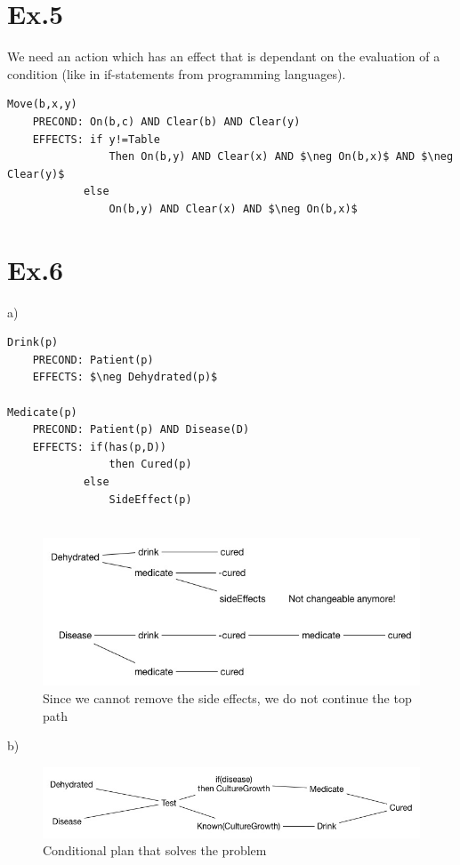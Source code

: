 \documentclass[11pt]{article}
\begin{document}
\section*{Ex.5}

We need an action which has an effect that is dependant on the evaluation of a condition (like in if-statements from programming languages).

\begin{lstlisting}[mathescape=true]
Move(b,x,y)
    PRECOND: On(b,c) AND Clear(b) AND Clear(y)
    EFFECTS: if y!=Table 
                Then On(b,y) AND Clear(x) AND $\neg On(b,x)$ AND $\neg Clear(y)$
            else
                On(b,y) AND Clear(x) AND $\neg On(b,x)$
\end{lstlisting}

\section*{Ex.6}

a)
\begin{lstlisting}[mathescape=true]
Drink(p)
    PRECOND: Patient(p)
    EFFECTS: $\neg Dehydrated(p)$
    
Medicate(p)
    PRECOND: Patient(p) AND Disease(D)
    EFFECTS: if(has(p,D)) 
                then Cured(p)
            else
                SideEffect(p)
                

\end{lstlisting}

\begin{figure}[ht]
	\centering
  \includegraphics[width=1\textwidth]{6a}
	\caption{Since we cannot remove the side effects, we do not continue the top path}
	\label{fig:6a}
\end{figure}

b)

\begin{figure}[ht]
	\centering
  \includegraphics[width=1\textwidth]{6a(2)}
	\caption{Conditional plan that solves the problem}
	\label{fig:6a(2)}
\end{figure}
\newpage
\end{document}
